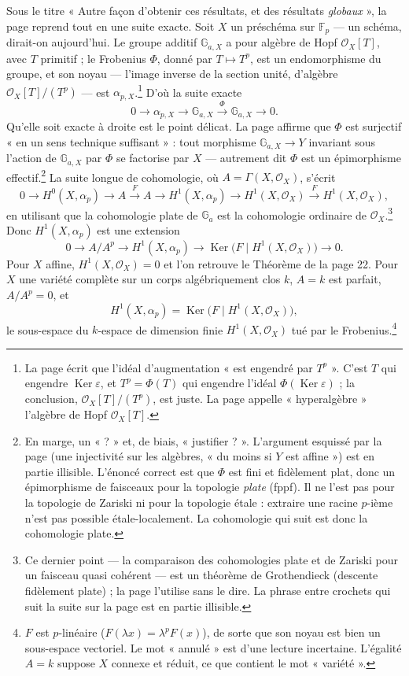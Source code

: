 \documentclass[11pt,a4paper]{article}
\begin{document}
Sous le titre « Autre façon d'obtenir ces résultats, et des résultats
\emph{globaux} », la page reprend tout en une suite exacte. Soit $X$ un
préschéma sur $\mathbb{F}_p$ --- un schéma, dirait-on aujourd'hui. Le groupe
additif $\mathbb{G}_{a,X}$ a pour algèbre de Hopf $\mathcal{O}_X[T]$, avec
$T$ primitif ; le Frobenius $\Phi$, donné par $T \mapsto T^p$, est un
endomorphisme du groupe, et son noyau --- l'image inverse de la section unité,
d'algèbre $\mathcal{O}_X[T]/(T^p)$ --- est $\alpha_{p,X}$.\footnote{La page
écrit que l'idéal d'augmentation « est engendré par $T^p$ ». C'est $T$ qui
engendre $\operatorname{Ker}\varepsilon$, et $T^p = \Phi(T)$ qui engendre
l'idéal $\Phi(\operatorname{Ker}\varepsilon)$ ; la conclusion,
$\mathcal{O}_X[T]/(T^p)$, est juste. La page appelle « hyperalgèbre »
l'algèbre de Hopf $\mathcal{O}_X[T]$.} D'où la suite exacte
\[
0 \longrightarrow \alpha_{p,X} \longrightarrow \mathbb{G}_{a,X}
\xrightarrow{\ \Phi\ } \mathbb{G}_{a,X} \longrightarrow 0 .
\]
Qu'elle soit exacte à droite est le point délicat. La page affirme que
$\Phi$ est surjectif « en un sens technique suffisant » : tout morphisme
$\mathbb{G}_{a,X} \to Y$ invariant sous l'action de $\mathbb{G}_{a,X}$ par
$\Phi$ se factorise par $X$ --- autrement dit $\Phi$ est un épimorphisme
effectif.\footnote{En marge, un « ? » et, de biais, « justifier ? ».
L'argument esquissé par la page (une injectivité sur les algèbres, « du moins
si $Y$ est affine ») est en partie illisible. L'énoncé correct est que
$\Phi$ est fini et fidèlement plat, donc un épimorphisme de faisceaux pour la
topologie \emph{plate} (fppf). Il ne l'est pas pour la topologie de Zariski ni
pour la topologie étale : extraire une racine $p$-ième n'est pas possible
étale-localement. La cohomologie qui suit est donc la cohomologie plate.}
La suite longue de cohomologie, où $A = \Gamma(X, \mathcal{O}_X)$, s'écrit
\[
0 \to H^0(X, \alpha_p) \to A \xrightarrow{\ F\ } A \to H^1(X, \alpha_p)
\to H^1(X, \mathcal{O}_X) \xrightarrow{\ F\ } H^1(X, \mathcal{O}_X),
\]
en utilisant que la cohomologie plate de $\mathbb{G}_a$ est la cohomologie
ordinaire de $\mathcal{O}_X$.\footnote{Ce dernier point --- la comparaison
des cohomologies plate et de Zariski pour un faisceau quasi cohérent --- est
un théorème de Grothendieck (descente fidèlement plate) ; la page l'utilise
sans le dire. La phrase entre crochets qui suit la suite sur la page est en
partie illisible.} Donc $H^1(X, \alpha_p)$ est une extension
\[
0 \to A/A^p \to H^1(X, \alpha_p) \to \operatorname{Ker}\bigl(F \mid
H^1(X, \mathcal{O}_X)\bigr) \to 0 .
\]
Pour $X$ affine, $H^1(X, \mathcal{O}_X) = 0$ et l'on retrouve le Théorème de
la page 22. Pour $X$ une variété complète sur un corps algébriquement clos
$k$, $A = k$ est parfait, $A/A^p = 0$, et
\[
H^1(X, \alpha_p) = \operatorname{Ker}\bigl(F \mid H^1(X, \mathcal{O}_X)\bigr),
\]
le sous-espace du $k$-espace de dimension finie $H^1(X, \mathcal{O}_X)$ tué
par le Frobenius.\footnote{$F$ est $p$-linéaire ($F(\lambda x) = \lambda^p
F(x)$), de sorte que son noyau est bien un sous-espace vectoriel. Le mot
« annulé » est d'une lecture incertaine. L'égalité $A = k$ suppose $X$ connexe
et réduit, ce que contient le mot « variété ».}
\end{document}
